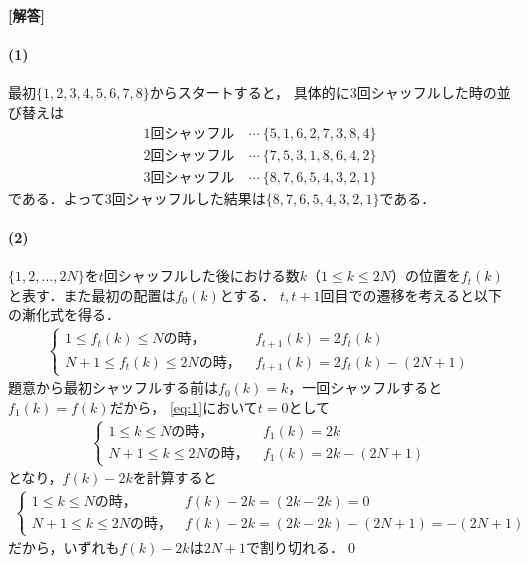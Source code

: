 \documentclass[../../main.tex]{subfiles}
\begin{document}
\begin{oframed}
  
\end{oframed}

{\bf [解答]}
\paragraph{(1)}

最初$\{1,2,3,4,5,6,7,8\}$からスタートすると，
具体的に$3$回シャッフルした時の並び替えは
\begin{align}
  1\text{回シャッフル}&\ \cdots\ \{5,1,6,2,7,3,8,4\}\\
  2\text{回シャッフル}&\ \cdots\ \{7,5,3,1,8,6,4,2\}\\
  3\text{回シャッフル}&\ \cdots\ \{8,7,6,5,4,3,2,1\}
\end{align}
である．よって$3$回シャッフルした結果は$\{8,7,6,5,4,3,2,1\}$である．

\paragraph{(2)}

$\{1,2,\ldots,2N\}$を$t$回シャッフルした後における数$k$（$1\le k\le 2N$）の位置を$f_t(k)$と表す．また最初の配置は$f_0(k)$とする．
$t, t+1$回目での遷移を考えると以下の漸化式を得る．
\begin{align}
  \begin{cases}
    1\le f_t(k)  \le N \text{の時，}&\ f_{t+1}(k)=2f_t(k)\\
    N+1\le f_t(k)\le 2N\text{の時，}&\ f_{t+1}(k)=2f_t(k)-(2N+1)
  \end{cases} \label{eq:1}
\end{align}
題意から最初シャッフルする前は$f_0(k)=k$，一回シャッフルすると$f_1(k)=f(k)$だから，
\cref{eq:1}において$t=0$として
\begin{align}
  \begin{cases}
    1\le k\le N\text{の時，}&\   f_1(k) = 2k \\
    N+1\le k\le2N\text{の時，}&\ f_1(k)  = 2k - (2N+1)
  \end{cases}
\end{align}
となり，$f(k)-2k$を計算すると
\begin{align}
  \begin{cases}
    1\le k\le N\text{の時，}  &\ f(k)-2k=(2k-2k)=0\\
    N+1\le k\le2N\text{の時，}&\ f(k)-2k=(2k-2k)-(2N+1)=-(2N+1)
  \end{cases}
\end{align}
だから，いずれも$f(k)-2k$は$2N+1$で割り切れる．\qed
\end{document}
